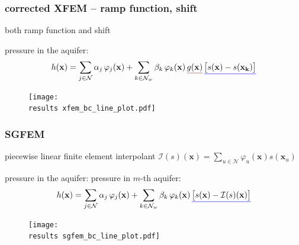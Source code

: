 \documentclass[10pt, xcolor=dvipsnames]{beamer} %
\def\phi{\varphi}
\newcommand{\results}{results/}
\newcommand{\rul}[2]{\textcolor{#1}{\underline{\textcolor{black}{#2}}}}
\begin{document}
\begin{frame}
  \frametitle{corrected XFEM -- ramp function, shift}
    both {\color{red}ramp function} and {\color{blue}shift}
    
    pressure in the aquifer:
    \begin{equation*}
      h(\mathbf{x})=\sum \limits_{j\in\mathcal{N}}\alpha_j \, \phi_j(\mathbf{x}) + \sum \limits_{k\in\mathcal{N}_w} \beta_{k}  \, \phi_k(\mathbf{x}) \, \rul{red}{g(\mathbf{x})} \, \rul{blue}{\big[s(\mathbf{x}) - s(\mathbf{x_k})\big]}
    \end{equation*}
    \vspace{-15pt} 
    \begin{figure}
      \centering
      \texttt{[image: \\results xfem\_bc\_line\_plot.pdf]}
    \end{figure}
\end{frame}

\begin{frame}
  \frametitle{SGFEM}
    {\color{blue}piecewise linear finite element interpolant} $\mathcal{I}(s)(\mathbf{x}) = \sum \limits_{u\in\mathcal{N}} \phi_u(\mathbf{x}) s(\mathbf{x}_u)$
    
    pressure in the aquifer:
    pressure in $m$-th aquifer:
    \begin{equation*}
      h(\mathbf{x})=\sum \limits_{j\in\mathcal{N}}\alpha_j \, \phi_j(\mathbf{x}) + \sum \limits_{k\in\mathcal{N}_w} \beta_{k}  \, \phi_k(\mathbf{x}) \, \rul{blue}{\big[s(\mathbf{x}) - \mathcal{I}(s)(\mathbf{x})\big]}
    \end{equation*}
    \vspace{-15pt} 
    \begin{figure}
      \centering
      \texttt{[image: \\results sgfem\_bc\_line\_plot.pdf]}
    \end{figure}
\end{frame}
\end{document}
